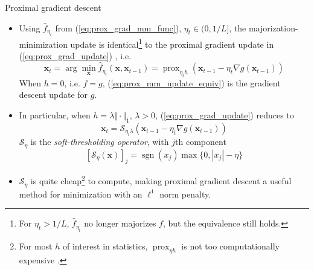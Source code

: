 \documentclass{beamer}
\numberwithin{equation}{section}
\newcommand{\aref}[1]{\alert{\ref{#1}}}
\begin{document}
\begin{frame}{Proximal gradient descent}
    \begin{itemize}
        \item
        Using $ \hat{f}_{\eta_t} $ from (\aref{eq:prox_grad_mm_func}),
        $ \eta_t \in (0, 1 / L] $, the majorization-minimization update is
        identical\footnote{
            For $ \eta_t > 1 / L $, $ \hat{f}_{\eta_t} $ no longer majorizes
            $ f $, but the equivalence still holds.
        } to the proximal gradient update in (\aref{eq:prox_grad_update})
        \cite{prox_algos}, i.e.
        \begin{equation} \label{eq:prox_mm_update_equiv}
            \mathbf{x}_t = \arg\min_\mathbf{x}
            \hat{f}_{\eta_t}(\mathbf{x}, \mathbf{x}_{t - 1}) =
            \operatorname{prox}_{\eta_t h}(\mathbf{x}_{t - 1} -
            \eta_t\nabla g(\mathbf{x}_{t - 1}))
        \end{equation}
        When $ h = 0 $, i.e. $ f = g $, (\aref{eq:prox_mm_update_equiv}) is
        the gradient descent update for $ g $.

        \item
        In particular, when $ h = \lambda\Vert\cdot\Vert_1 $,
        $ \lambda > 0 $, (\aref{eq:prox_grad_update}) reduces to
        \begin{equation} \label{eq:prox_grad_update_l1}
            \mathbf{x}_t = \mathcal{S}_{\eta_t\lambda}(\mathbf{x}_{t - 1} -
            \eta_t\nabla g(\mathbf{x}_{t - 1}))
        \end{equation}
        $ \mathcal{S}_\eta $ is the \textit{soft-thresholding operator}, with
        $ j $th component \cite{stat_learn_sparsity}
        \begin{equation} \label{eq:soft_threshold}
            [\mathcal{S}_\eta(\mathbf{x})]_j =
            \operatorname{sgn}(x_j)\max\{0, |x_j| - \eta\}        
        \end{equation}

        \item
        $ \mathcal{S}_\eta $ is quite cheap\footnote{
            For most $ h $ of interest in statistics,
            $ \operatorname{prox}_{\eta h} $ is not too computationally
            expensive \cite{stat_learn_sparsity}.
        } to compute, making proximal gradient descent a useful method for
        minimization with an $ \ell^1 $ norm penalty.
    \end{itemize}

    \bigskip
\end{frame}
\end{document}
